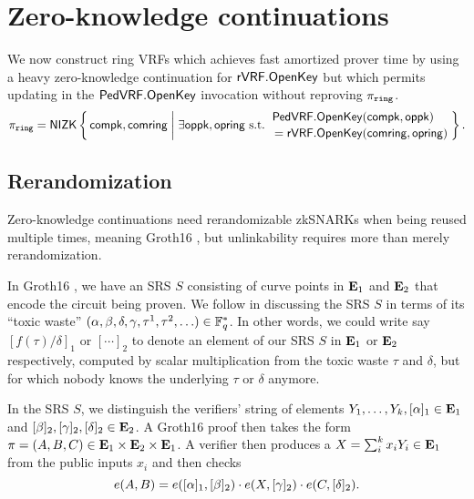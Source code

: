 
\section{Zero-knowledge continuations}
\label{sec:rvrf_cont}

\newcommand\rrSNARK{\primalgo{Groth16}\xspace}
\newcommand\rrSNARKweak{\primalgo{Groth16/KZG}\xspace}
\newcommand\pifast{\ensuremath{\pi_{\mathtt{fast}}}\xspace}
\newcommand\pisk{\ensuremath{\pi_{\mathtt{sk}}}\xspace}
\newcommand\pipk{\ensuremath{\dot{\pi}_{\mathtt{pk}}}\xspace}


We now construct ring VRFs which achieves fast amortized prover time
by using a heavy zero-knowledge continuation for ${\mathsf{rVRF}}.{\mathsf{OpenKey}}$ but
which permits updating \openpk in the ${\mathsf{PedVRF}}.{\mathsf{OpenKey}}$ invocation
without reproving $\pi_{\mathtt{ring}}$.
$$ \piring = \NIZK \Setst{ \compk, \comring }{
 \exists \openpk,\openring \textrm{\ s.t.\ } 
 \genfrac{}{}{0pt}{}{\PedVRF.\OpenKey(\compk,\openpk) \quad}{\,\, = \rVRF.\OpenKey(\comring,\openring)}
} \mathperiod $$

\subsection{Rerandomization}

Zero-knowledge continuations need rerandomizable zkSNARKs
when being reused multiple times, meaning Groth16 \cite{Groth16},
but unlinkability requires more than merely rerandomization.

In Groth16 \cite{Groth16}, we have an SRS $S$ consisting of curve
points in ${\mathbf{E}}_1$ and ${\mathbf{E}}_2$ that encode the circuit being proven.
We follow \cite{Groth16} in discussing the SRS $S$ in terms of
its ``toxic waste''
 $(\alpha,\beta,\delta,\gamma,\tau^1,\tau^2,\ldots) \in \mathbb{F}_q^*$.
In other words, we could write say $[ f(\tau)/\delta ]_1$ or $[\cdots]_2$
to denote an element of our SRS $S$ in ${\mathbf{E}}_1$ or ${\mathbf{E}}_2$ respectively,
computed by scalar multiplication from the toxic waste $\tau$ and $\delta$,
 but for which nobody knows the underlying $\tau$ or $\delta$ anymore.

In the SRS $S$, we distinguish the verifiers' string of elements
 $Y_1,\ldots,Y_k, [\alpha]_1 \in {\mathbf{E}}_1$ and
 $[\beta]_2, [\gamma]_2, [\delta]_2 \in {\mathbf{E}}_2$.
A Groth16 \cite{Groth16} proof then takes the form 
 $\pi = (A,B,C) \in {\mathbf{E}}_1 \times {\mathbf{E}}_2 \times {\mathbf{E}}_1$.
A verifier then produces a $X = \sum_i^k x_i Y_i \in {\mathbf{E}}_1$ from
 the public inputs $x_i$ and then checks 
$$ e(A,B) = e([\alpha]_1, [\beta]_2) \cdot
 e(X, [\gamma]_2) \cdot e(C, [\delta]_2) . $$

